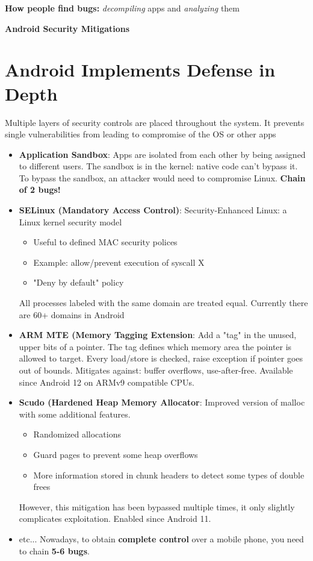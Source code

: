 \documentclass[11pt]{article}
\begin{document}
\textbf{How people find bugs:} \textit{decompiling} apps and \textit{analyzing} them
\vspace{0.5cm}

\begin{center}
  {\LARGE \textbf{Android Security Mitigations}}
\end{center}
\vspace{0.5cm}

\section*{Android Implements Defense in Depth}

Multiple layers of security controls are placed throughout the system. It prevents single vulnerabilities from leading to compromise of the OS or other apps

\begin{itemize}
	\item \textbf{Application Sandbox}: Apps are isolated from each other by being assigned to different users. The sandbox is in the kernel: native code can't bypass it. To bypass the sandbox, an attacker would need to compromise Linux. \textbf{Chain of 2 bugs!}
	\item \textbf{SELinux (Mandatory Access Control)}: Security-Enhanced Linux: a Linux kernel security model
		\begin{itemize}
			\item Useful to defined MAC security polices
			\item Example: allow/prevent execution of syscall X
			\item "Deny by default" policy 
		\end{itemize}
	All processes labeled with the same domain are treated equal. Currently there are 60+ domains in Android
	\item \textbf{ARM MTE (Memory Tagging Extension}: Add a "tag" in the unused, upper bits of a pointer. The tag defines which memory area the pointer is allowed to target. Every load/store is checked, raise exception if pointer goes out of bounds. Mitigates against: buffer overflows, use-after-free. Available since Android 12 on ARMv9 compatible CPUs. 
	\item \textbf{Scudo (Hardened Heap Memory Allocator}: Improved version of malloc with some additional features.
		\begin{itemize}
			\item Randomized allocations
			\item Guard pages to prevent some heap overflows
			\item More information stored in chunk headers to detect some types of double frees
		\end{itemize}
		However, this mitigation has been bypassed multiple times, it only slightly complicates exploitation. Enabled since Android 11.
	\item etc... Nowadays, to obtain \textbf{complete control} over a mobile phone, you need to chain \textbf{5-6 bugs}. 
\end{itemize}
\end{document}

